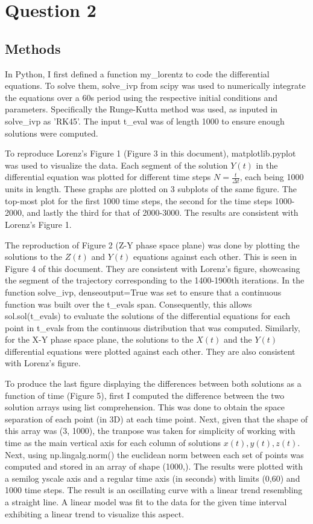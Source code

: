 \documentclass{article}
\begin{document}
\newpage
\section{Question 2}
\subsection{Methods}

In Python, I first defined a function my\_lorentz to code the differential equations. To solve them, solve\_ivp from scipy was used to numerically integrate the equations over a 60s period using the respective initial conditions and parameters. Specifically the Runge-Kutta method was used, as inputed in solve\_ivp as 'RK45'. The input t\_eval was of length 1000 to ensure enough solutions were computed.  \newline

To reproduce Lorenz's Figure 1 (Figure 3 in this document), matplotlib.pyplot was used to visualize the data. Each segment of the solution $Y(t)$ in the differential equation was plotted for different time steps $N=\frac{t}{\Delta t}$, each being 1000 units in length. These graphs are plotted on 3 subplots of the same figure. The top-most plot for the first 1000 time steps, the second for the time steps 1000-2000, and lastly the third for that of 2000-3000. The results are consistent with Lorenz's Figure 1. \newline

The reproduction of Figure 2 (Z-Y phase space plane) was done by plotting the solutions to the $Z(t)$ and $Y(t)$ equations against each other. This is seen in Figure 4 of this document. They are consistent with Lorenz's figure, showcasing the segment of the trajectory corresponding to the 1400-1900th iterations. In the function solve\_ivp, denseoutput=True was set to ensure that a continuous function was built over the t\_evals span. Consequently, this allows sol.sol(t\_evals) to evaluate the solutions of the differential equations for each point in t\_evals from the continuous distribution that was computed. Similarly, for the X-Y phase space plane, the solutions to the $X(t)$ and the $Y(t)$ differential equations were plotted against each other. They are also consistent with Lorenz's figure. \newline

To produce the last figure displaying the differences between both solutions as a function of time (Figure 5), first I computed the difference between the two solution arrays using list comprehension. This was done to obtain the space separation of each point (in 3D) at each time point. Next, given that the shape of this array was (3, 1000), the tranpose was taken for simplicity of working with time as the main vertical axis for each column of solutions $x(t), y(t) , z(t)$. Next, using np.lingalg.norm() the euclidean norm between each set of points was computed and stored in an array of shape (1000,). The results were plotted with a semilog yscale axis and a regular time axis (in seconds) with limits (0,60) and 1000 time steps. The result is an oscillating curve with a linear trend resembling a straight line. A linear model was fit to the data for the given time interval exhibiting a linear trend to visualize this aspect. 
\newpage
\end{document}
